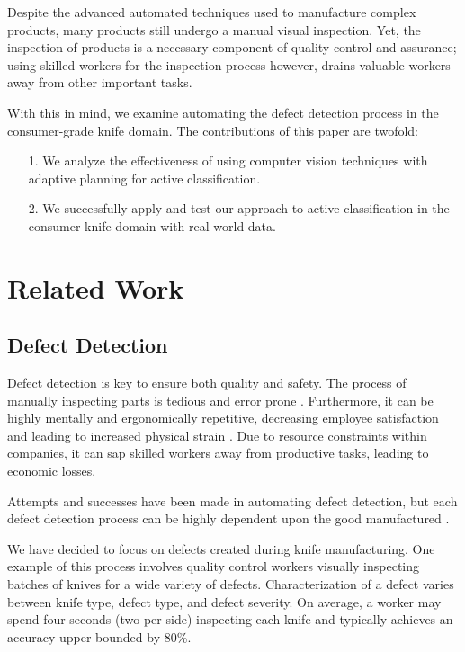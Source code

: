 \documentclass[letterpaper, 10 pt, conference]{ieeeconf}  %
\begin{document}
Despite the advanced automated techniques used to manufacture complex products, many products still undergo a manual visual inspection. Yet, the inspection of products is a necessary component of quality control and assurance; using skilled workers for the inspection process however, drains valuable workers away from other important tasks.

With this in mind, we examine automating the defect detection process in the consumer-grade knife domain. The contributions of this paper are twofold:\\

\begin{enumerate}
	\item[1.] We analyze the effectiveness of using computer vision techniques with adaptive planning for active classification.\\
	\item[2.] We successfully apply and test our approach to active classification in the consumer knife domain with real-world data.\\
\end{enumerate}

\section{Related Work}

\subsection{Defect Detection}
Defect detection is key to ensure both quality and safety. The process of manually inspecting parts is tedious and error prone \cite{automatedVisionInspection}. Furthermore, it can be highly mentally and ergonomically repetitive, decreasing employee satisfaction and leading to increased physical strain \cite{evans2005management}\cite{eklund1997ergonomics}. Due to resource constraints within companies, it can sap skilled workers away from productive tasks, leading to economic losses.


Attempts and successes have been made in automating defect detection, but each defect detection process can be highly dependent upon the good manufactured \cite{automatedVisionInspection}\cite{defectGabor}\cite{defectSewer}.

We have decided to focus on defects created during knife manufacturing. One example of this process involves quality control workers visually inspecting batches of knives for a wide variety of defects. Characterization of a defect varies between knife type, defect type, and defect severity. On average, a worker may spend four seconds (two per side) inspecting each knife and typically achieves an accuracy upper-bounded by 80\%.
\end{document}
